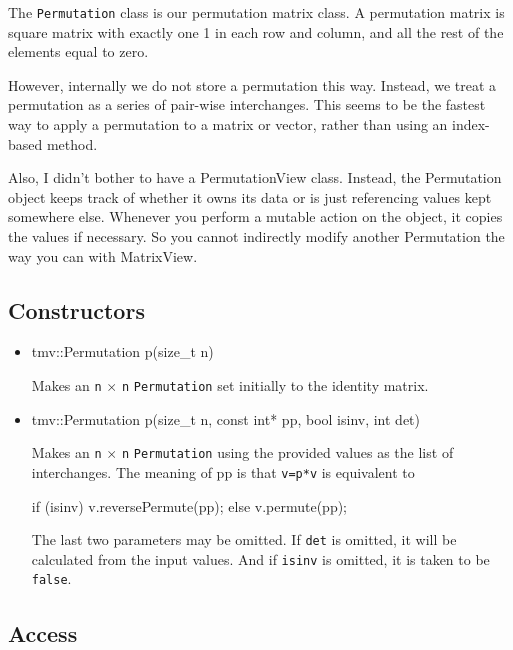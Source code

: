 \documentclass[twoside,letterpaper,11pt]{article}
\renewcommand{\tt}[1]{{\lstinline {#1}}}
\begin{document}
The \tt{Permutation} class is our permutation matrix class.
A permutation matrix is square matrix with exactly one 1 in each row and
column, and all the rest of the elements equal to zero.

However, internally we do not store a permutation this way.
Instead, we treat a permutation as a series of pair-wise interchanges.
This seems to be the fastest way to apply a permutation to a matrix or
vector, rather than using an index-based method.

Also, I didn't bother to have a PermutationView class.  Instead, the 
Permutation object keeps track of whether it owns its data or is just
referencing values kept somewhere else.  Whenever you perform 
a mutable action on the object, it copies the values if necessary.
So you cannot indirectly modify another Permutation the way you can
with MatrixView.

\subsection{Constructors}
\label{Permutation_Constructors}

\begin{itemize}
\item 
\begin{tmvcode}
tmv::Permutation p(size_t n)
\end{tmvcode}
Makes an \tt{n} $\times$ \tt{n} \tt{Permutation} set initially to the identity matrix.

\item
\begin{tmvcode}
tmv::Permutation p(size_t n, const int* pp, bool isinv, int det)
\end{tmvcode}
Makes an \tt{n} $\times$ \tt{n} \tt{Permutation} using the provided values as the 
list of interchanges.  The meaning of pp is that \tt{v=p*v} is equivalent to
\begin{tmvcode}
if (isinv) v.reversePermute(pp);
else v.permute(pp);
\end{tmvcode}
The last two parameters may be omitted.  If \tt{det} is omitted, it will be calculated
from the input values.  And if \tt{isinv} is omitted, it is taken to be \tt{false}.

\end{itemize}


\subsection{Access}
\label{Permutation_Access}
\end{document}
